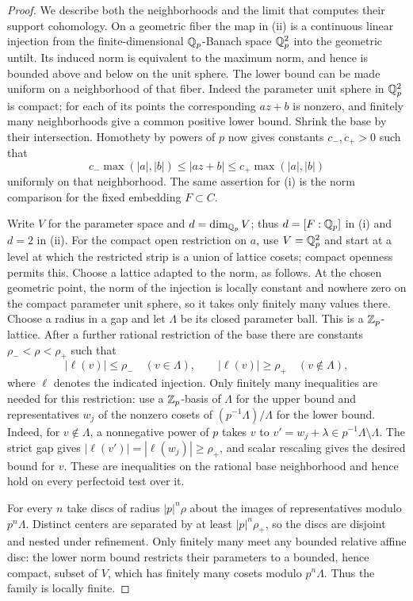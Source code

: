 \begin{proof}
We describe both the neighborhoods and the limit that computes
their support cohomology.  On a geometric fiber the map in (ii)
is a continuous linear injection from the finite-dimensional
$\mathbb Q_p$-Banach space $\mathbb Q_p^2$ into the geometric untilt.  Its induced
norm is equivalent to the maximum norm, and hence is bounded above
and below on the unit sphere.  The lower bound can be made uniform on a
neighborhood of that fiber.  Indeed the parameter unit sphere
in $\mathbb Q_p^2$ is compact; for each of its points the corresponding
$az+b$ is nonzero, and finitely many neighborhoods give a common
positive lower bound.  Shrink the base by their intersection.
Homothety by powers of $p$ now gives constants $c_-,c_+>0$ such that
\[
 c_-\max(|a|,|b|)\leq |az+b|
       \leq c_+\max(|a|,|b|)
\]
uniformly on that neighborhood.  The same assertion for (i) is
the norm comparison for the fixed embedding $F\subset C$.

Write $V$ for the parameter space and $d=\dim_{\mathbb Q_p}V$;
thus $d=[F:\mathbb Q_p]$ in \textup{(i)} and $d=2$ in \textup{(ii)}.
For the compact open restriction on $a$, use $V=\mathbb Q_p^2$
and start at a level at which the restricted strip is a
union of lattice cosets; compact openness permits this.
Choose a lattice adapted to the norm, as follows.  At the
chosen geometric point, the norm of the injection is locally
constant and nowhere zero on the compact parameter unit sphere,
so it takes only finitely many values there.  Choose a radius
in a gap and let $\Lambda$ be its closed parameter ball.
This is a $\mathbb Z_p$-lattice.  After a further rational restriction
of the base there are constants $\rho_-<\rho<\rho_+$ such that
\[
 |\ell(v)|\leq\rho_-\quad(v\in\Lambda),\qquad
 |\ell(v)|\geq\rho_+\quad(v\notin\Lambda),
\]
where $\ell$ denotes the indicated injection.  Only finitely
many inequalities are needed for this restriction: use a
$\mathbb Z_p$-basis of $\Lambda$ for the upper bound and representatives
$w_j$ of the nonzero cosets of $(p^{-1}\Lambda)/\Lambda$
for the lower bound.  Indeed, for $v\notin\Lambda$, a
nonnegative power of $p$ takes $v$ to
$v'=w_j+\lambda\in p^{-1}\Lambda\setminus\Lambda$.
The strict gap gives
$|\ell(v')|=|\ell(w_j)|\geq\rho_+$, and scalar rescaling
gives the desired bound for $v$.  These are inequalities
on the rational base neighborhood and hence hold on
every perfectoid test over it.

For every $n$ take discs of radius $|p|^n\rho$ about the
images of representatives modulo $p^n\Lambda$.
Distinct centers are separated by at least $|p|^n\rho_+$,
so the discs are disjoint and nested under refinement.
Only finitely many meet any bounded relative affine disc:
the lower norm bound restricts their parameters to a bounded,
hence compact, subset of $V$, which has finitely many cosets
modulo $p^n\Lambda$.  Thus the family is locally finite.


\end{proof}
